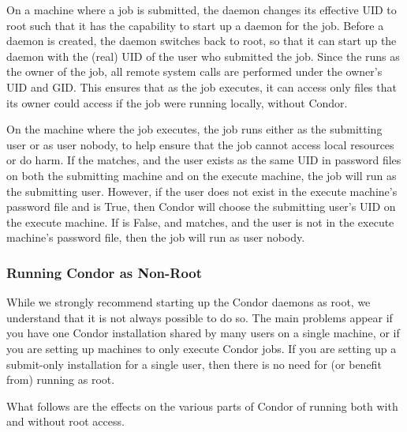 On a machine where a job is submitted,
the  daemon
changes its effective UID to root
such that it has the capability to start up a  daemon
for the job.
Before a  daemon is created,
the  daemon
switches back to root,
so that it can start up the  daemon with the (real) UID
of the user who submitted the job.
Since the  runs as the owner of the job,
all remote system calls are performed under the owner's UID
and GID.
This ensures that as the job executes,
it can access only files that its owner could access if the job
were running locally, without Condor.

On the machine where the job executes, the 
job runs either as the submitting user or as user nobody,
to help ensure that the job cannot access local resources or do harm.  
If the  matches,
and the user exists as the same UID in password files
on both the submitting machine and on the execute machine,
the job will run as the submitting user.
However, if the user does not exist in the execute machine's
password file and  is True,
then Condor will choose the submitting user's UID on the
execute machine.
If  is False,
and  matches,
and the user is not in the execute machine's password file,
then the job will run as user nobody.

\subsubsection{\label{sec:Non-Root}Running Condor as Non-Root}

While we strongly recommend starting up the Condor daemons as root, we
understand that it is not always possible to do so.  The main problems
appear if you have one Condor installation shared by many users on a
single machine, or if you are setting up machines to only execute
Condor jobs.  If you are setting up a submit-only installation for a
single user, then there is no need for (or benefit from) running as
root.

What follows are the effects on the various parts of Condor of running
both with and without root access.

